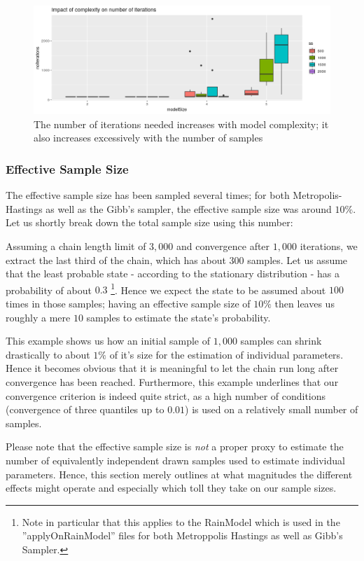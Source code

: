 \begin{figure}
	\includegraphics[width=\linewidth]{img/sim_ben_mh_iterations.png}
	\caption{The number of iterations needed increases with model complexity; it also increases excessively with the number of samples}
	\label{fig:mh_iterations}
\end{figure}


\subsubsection*{Effective Sample Size}
The effective sample size has been sampled several times; for both Metropolis-Hastings as well as the Gibb's sampler, the effective sample size was around $10\%$. Let us shortly break down the total sample size using this number:

Assuming a chain length limit of $3,000$ and convergence after $1,000$ iterations, we extract the last third of the chain, which has about $300$ samples. Let us assume that the least probable state - according to the stationary distribution - has a probability of about $0.3$ \footnote{Note in particular that this applies to the RainModel which is used in the ''applyOnRainModel'' files for both Metroppolis Hastings as well as Gibb's Sampler. }. Hence we expect the state to be assumed about $100$ times in those samples; having an effective sample size of $10\%$ then leaves us roughly a mere $10$ samples to estimate the state's probability. 

This example shows us how an initial sample of $1,000$ samples can shrink drastically to about $1\%$ of it's size for the estimation of individual parameters. Hence it becomes obvious that it is meaningful to let the chain run long after convergence has been reached. Furthermore, this example underlines that our convergence criterion is indeed quite strict, as a high number of conditions (convergence of three quantiles up to $0.01$) is used on a relatively small number of samples.

Please note that the effective sample size is \textit{not} a proper proxy to estimate the number of equivalently independent drawn samples used to estimate individual parameters. Hence, this section merely outlines at what magnitudes the different effects might operate and especially which toll they take on our sample sizes. 